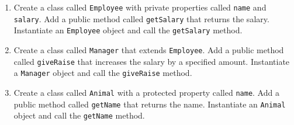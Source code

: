\documentclass{article}
\begin{document}
\begin{enumerate}
	\item Create a class called \verb|Employee| with private properties called \verb|name| and \verb|salary|. Add a public method called \verb|getSalary| that returns the salary. Instantiate an \verb|Employee| object and call the \verb|getSalary| method.
	
	\item Create a class called \verb|Manager| that extends \verb|Employee|. Add a public method called \verb|giveRaise| that increases the salary by a specified amount. Instantiate a \verb|Manager| object and call the \verb|giveRaise| method.
	
	\item Create a class called \verb|Animal| with a protected property called \verb|name|. Add a public method called \verb|getName| that returns the name. Instantiate an \verb|Animal| object and call the \verb|getName| method.
\end{enumerate}
\end{document}
